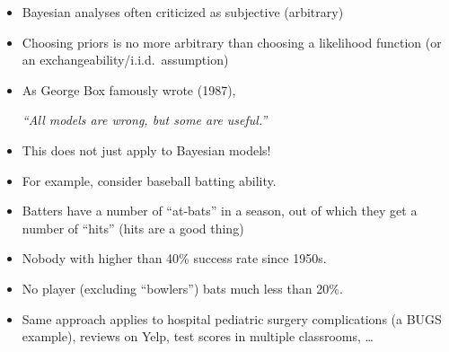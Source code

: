 \documentclass[10pt]{report}
\begin{document}
\begin{itemize}
\item Bayesian analyses often criticized as subjective (arbitrary)
\item Choosing priors is no more arbitrary than choosing a likelihood
  function (or an exchangeability/i.i.d.\ assumption)
\item As George Box famously wrote (1987),
\begin{center}
\large
{\slshape ``All models are wrong, but some are useful.''}
\end{center}
\item This does not just apply to Bayesian models!
\end{itemize}



\begin{itemize}
\item For example, consider baseball batting ability.
\item Batters have a number of ``at-bats'' in a season, out of which they
  get a number of ``hits'' (hits are a good thing)
\item Nobody with higher than 40\% success rate since 1950s.
\item No player (excluding ``bowlers'') bats much less than 20\%.
\item Same approach applies to hospital pediatric surgery
  complications (a BUGS example), reviews on Yelp,
  test scores in multiple classrooms, \ldots
\end{itemize}
\end{document}
